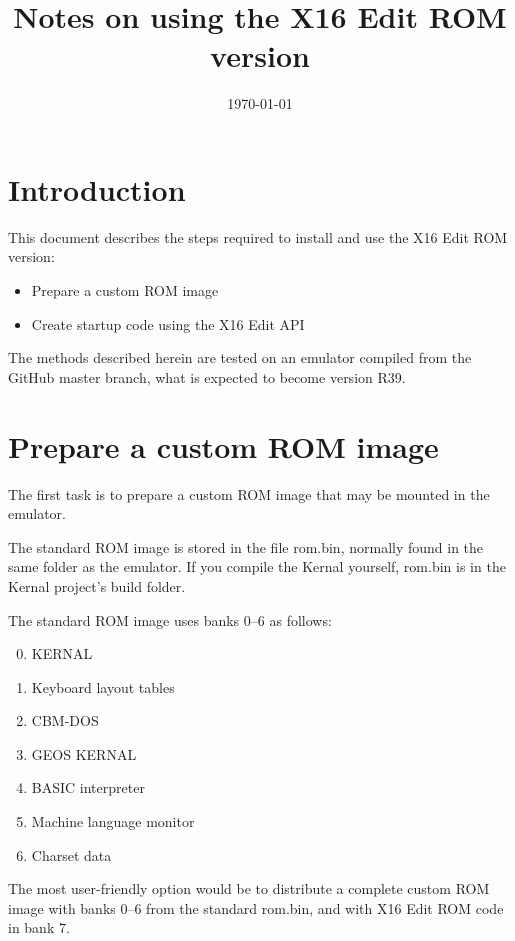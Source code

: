 \documentclass{article}
\title{Notes on using the X16 Edit ROM version}
\date{\today}
\begin{document}
\maketitle

\section{Introduction}

    This document describes the steps required to install and use the X16 Edit ROM version:

    \begin{itemize}
        \item Prepare a custom ROM image
        \item Create startup code using the X16 Edit API
    \end{itemize}

    \noindent The methods described herein are tested on an emulator compiled from the GitHub master branch, what is expected to become version R39.

\section{Prepare a custom ROM image}

    The first task is to prepare a custom ROM image that may be mounted in the emulator.

    The standard ROM image is stored in the file rom.bin, normally found in the same folder as the emulator. If you compile the Kernal yourself,
    rom.bin is in the Kernal project's build folder.

    The standard ROM image uses banks 0--6 as follows:

    \begin{enumerate}
        \setcounter{enumi}{-1}
        \item KERNAL
        \item Keyboard layout tables
        \item CBM-DOS
        \item GEOS KERNAL
        \item BASIC interpreter
        \item Machine language monitor
        \item Charset data
    \end{enumerate}

    \noindent The most user-friendly option would be to distribute a complete custom ROM image with
    banks 0--6 from the standard rom.bin, and with X16 Edit ROM code in bank 7.
\end{document}
